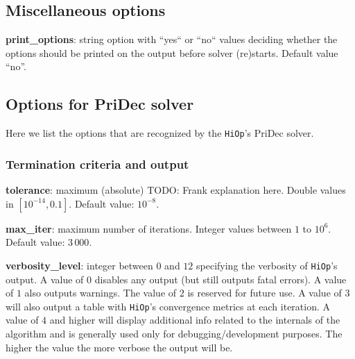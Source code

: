 \documentclass[11pt]{article}
\newcommand{\Hi}{\texttt{HiOp}\xspace}
\begin{document}
\medskip

\subsection{Miscellaneous options}

\noindent \textbf{print\_options}: string option with ``yes`` or ``no`` values deciding whether the options should be printed on the output before solver (re)starts. Default value ``no''.


\subsection{Options for PriDec solver}
Here we list the options that are recognized by the \Hi's PriDec solver.

\subsubsection{Termination criteria and output}

\noindent \textbf{tolerance}: maximum (absolute)  TODO: Frank explanation here. Double values in $[10^{-14},0.1]$. Default value: $10^{-8}$. 

\medskip


\medskip

\noindent \textbf{max\_iter}: maximum number of iterations. Integer values between $1$ to $10^6$. Default value: $3\,000$.

\medskip


\medskip

\noindent \textbf{verbosity\_level}: integer between $0$ and $12$ specifying the verbosity of \Hi's output. A value of $0$ disables any output (but still outputs fatal errors). A value of $1$ also outputs warnings. The value of $2$ is reserved for future use. A value of $3$ will also output a table with \Hi's convergence metrics at each iteration. A value of $4$ and higher will display additional info related to the internals of the algorithm and is generally used only for debugging/development purposes. The higher the value the more verbose the output will be.
\end{document}
